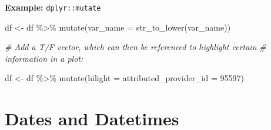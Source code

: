 \documentclass[
]{book}
\newenvironment{Shaded}{\begin{snugshade}}{\end{snugshade}}
\newcommand{\AttributeTok}[1]{\textcolor[rgb]{0.77,0.63,0.00}{#1}}
\newcommand{\CommentTok}[1]{\textcolor[rgb]{0.56,0.35,0.01}{\textit{#1}}}
\newcommand{\DecValTok}[1]{\textcolor[rgb]{0.00,0.00,0.81}{#1}}
\newcommand{\FunctionTok}[1]{\textcolor[rgb]{0.00,0.00,0.00}{#1}}
\newcommand{\NormalTok}[1]{#1}
\newcommand{\OtherTok}[1]{\textcolor[rgb]{0.56,0.35,0.01}{#1}}
\newcommand{\SpecialCharTok}[1]{\textcolor[rgb]{0.00,0.00,0.00}{#1}}
\begin{document}
\textbf{Example:} \texttt{dplyr::mutate}

\begin{Shaded}
\begin{Highlighting}[]
\NormalTok{df }\OtherTok{\textless{}{-}}
\NormalTok{  df }\SpecialCharTok{\%\textgreater{}\%}
  \FunctionTok{mutate}\NormalTok{(}\AttributeTok{var\_name =} \FunctionTok{str\_to\_lower}\NormalTok{(var\_name))}

\CommentTok{\# Add a T/F vector, which can then be referenced to highlight certain }
\CommentTok{\# information in a plot:}

\NormalTok{df }\OtherTok{\textless{}{-}} 
\NormalTok{  df }\SpecialCharTok{\%\textgreater{}\%} 
  \FunctionTok{mutate}\NormalTok{(}\AttributeTok{hilight =} \AttributeTok{attributed\_provider\_id =} \DecValTok{95597}\NormalTok{)}
\end{Highlighting}
\end{Shaded}

\hypertarget{dates-and-datetimes-1}{%
\section{Dates and Datetimes}\label{dates-and-datetimes-1}}
\end{document}
